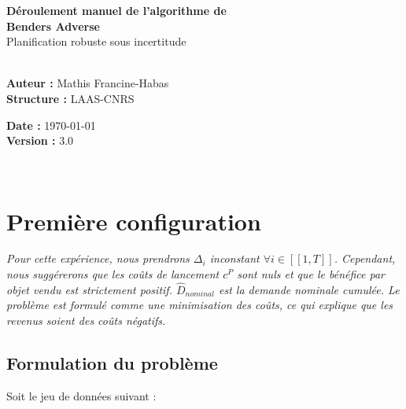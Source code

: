 \documentclass[11pt,a4paper]{article}
\begin{document}
    \begin{center}
        {\color{mainblue}\LARGE\bfseries Déroulement manuel de l'algorithme de\\ Benders Adverse}\\[0.3cm]
        {\color{slate}\large Planification robuste sous incertitude}\\[0.5cm]
        \noindent\makebox[\linewidth]{\color{bordergrey}\rule{\linewidth}{1pt}}\\[0.2cm]
        \begin{minipage}{0.48\textwidth}
            \begin{flushleft} \small
                \textbf{Auteur :} Mathis Francine-Habas \\
                \textbf{Structure :} LAAS-CNRS
            \end{flushleft}
        \end{minipage}
        \hfill
        \begin{minipage}{0.48\textwidth}
            \begin{flushright} \small
                \textbf{Date :} \today \\
                \textbf{Version :} 3.0
            \end{flushright}
        \end{minipage}\\[0.1cm]
        \noindent\makebox[\linewidth]{\color{bordergrey}\rule{\linewidth}{1pt}}
    \end{center}
    
    \section{Première configuration}
    \label{sec:formulation1}
    
    \textit{Pour cette expérience, nous prendrons $\Delta_i$ inconstant $\forall i\in[\![1, T]\!]$. Cependant, nous suggérerons que les coûts de lancement $c^P$ sont nuls et que le bénéfice par objet vendu est strictement positif. $\widehat{D}_{nominal}$ est la demande nominale cumulée. Le problème est formulé comme une minimisation des coûts, ce qui explique que les revenus soient des coûts négatifs.}
    
    \subsection{Formulation du problème}
    
    Soit le jeu de données suivant :
    
\end{document}
